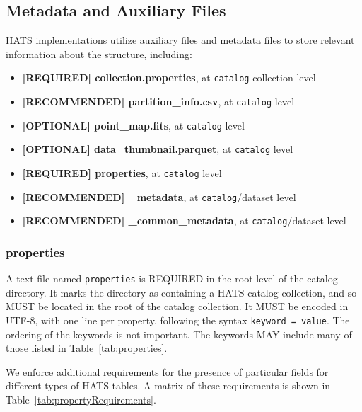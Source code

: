 \documentclass[11pt,a4paper]{ivoa}
\begin{document}
    \subsection{Metadata and Auxiliary Files} \label{sec:meta}
    HATS implementations utilize auxiliary files and metadata files to store relevant information about the  structure, including:
    \begin{itemize}
    	\item \textbf{[REQUIRED] collection.properties}, at  \texttt{catalog} collection level
        \item \textbf{[RECOMMENDED] partition\_info.csv}, at  \texttt{catalog} level
        \item \textbf{[OPTIONAL] point\_map.fits}, at  \texttt{catalog} level
        \item \textbf{[OPTIONAL] data\_thumbnail.parquet}, at  \texttt{catalog} level
        \item \textbf{[REQUIRED] properties}, at  \texttt{catalog} level
        \item \textbf{[RECOMMENDED] \_metadata}, at  \texttt{catalog}/dataset level
        \item \textbf{[RECOMMENDED] \_common\_metadata}, at  \texttt{catalog}/dataset level
    \end{itemize}
    
    \subsubsection{properties} 

A text file named \texttt{properties} is REQUIRED in the root level of the catalog directory.
It marks the directory as containing a HATS catalog collection, and so MUST be located in the 
root of the catalog collection.
It MUST be encoded in UTF-8, with one line per property, following the syntax \texttt{keyword = value}.
The ordering of the keywords is not important. The keywords MAY include many of those listed in Table~\ref{tab:properties}.

We enforce additional requirements for the presence of particular fields for different types of HATS tables. 
A matrix of these requirements is shown in Table~\ref{tab:propertyRequirements}.
\end{document}
